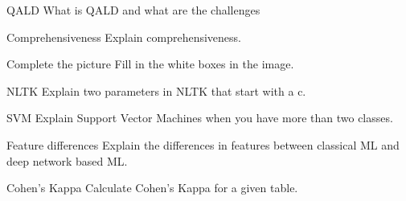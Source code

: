 \documentclass{article}
\begin{document}
\begin{exercise}{QALD}
  What is QALD and what are the challenges

  \begin{solution}
  \end{solution}
\end{exercise}




\begin{exercise}{Comprehensiveness}
  Explain comprehensiveness.

  \begin{solution}
  \end{solution}
\end{exercise}

\begin{exercise}{Complete the picture}
  Fill in the white boxes in the image.


  \begin{solution}
  \end{solution}
\end{exercise}

\begin{exercise}{NLTK}
  Explain two parameters in NLTK that start with a c.

  \begin{solution}
  \end{solution}
\end{exercise}

\begin{exercise}{SVM}
  Explain Support Vector Machines when you have more than two classes.

  \begin{solution}
  \end{solution}
\end{exercise}

\begin{exercise}{Feature differences}
  Explain the differences in features between classical ML and deep network based ML.

  \begin{solution}
  \end{solution}
\end{exercise}

\begin{exercise}{Cohen's Kappa}
  Calculate Cohen's Kappa for a given table.

  \begin{solution}
  \end{solution}
\end{exercise}
\end{document}
